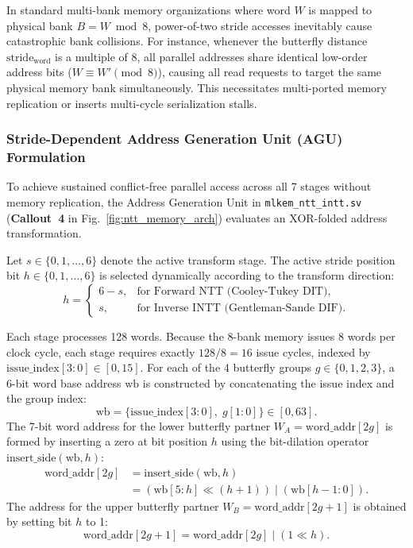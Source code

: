 In standard multi-bank memory organizations where word $W$ is mapped to physical bank $B = W \bmod 8$, power-of-two stride accesses inevitably cause catastrophic bank collisions. For instance, whenever the butterfly distance $\text{stride}_{\text{word}}$ is a multiple of 8, all parallel addresses share identical low-order address bits ($W \equiv W' \pmod 8$), causing all read requests to target the same physical memory bank simultaneously. This necessitates multi-ported memory replication or inserts multi-cycle serialization stalls.

\subsubsection{Stride-Dependent Address Generation Unit (AGU) Formulation}
To achieve sustained conflict-free parallel access across all 7 stages without memory replication, the Address Generation Unit in \texttt{mlkem\_ntt\_intt.sv} (\textbf{Callout~4} in Fig.~\ref{fig:ntt_memory_arch}) evaluates an XOR-folded address transformation.

Let $s \in \{0, 1, \dots, 6\}$ denote the active transform stage. The active stride position bit $h \in \{0, 1, \dots, 6\}$ is selected dynamically according to the transform direction:
\begin{equation}
\label{eq:stride_bit_h}
h = \begin{cases}
6 - s, & \text{for Forward NTT (Cooley-Tukey DIT)}, \\
s, & \text{for Inverse INTT (Gentleman-Sande DIF)}.
\end{cases}
\end{equation}

Each stage processes 128 words. Because the 8-bank memory issues 8 words per clock cycle, each stage requires exactly $128 / 8 = 16$ issue cycles, indexed by $\text{issue\_index}[3:0] \in [0, 15]$. For each of the 4 butterfly groups $g \in \{0, 1, 2, 3\}$, a 6-bit word base address $\text{wb}$ is constructed by concatenating the issue index and the group index:
\begin{equation}
\label{eq:word_base}
\text{wb} = \{\text{issue\_index}[3:0], \; g[1:0]\} \in [0, 63].
\end{equation}
The 7-bit word address for the lower butterfly partner $W_A = \text{word\_addr}[2g]$ is formed by inserting a zero at bit position $h$ using the bit-dilation operator $\text{insert\_side}(\text{wb}, h)$:
\begin{align}
\label{eq:insert_side}
\text{word\_addr}[2g] &= \text{insert\_side}(\text{wb}, h) \nonumber \\
&= (\text{wb}[5:h] \ll (h + 1)) \mid (\text{wb}[h-1:0]).
\end{align}
The address for the upper butterfly partner $W_B = \text{word\_addr}[2g+1]$ is obtained by setting bit $h$ to 1:
\begin{equation}
\label{eq:partner_wb_formula}
\text{word\_addr}[2g+1] = \text{word\_addr}[2g] \mid (1 \ll h).
\end{equation}

